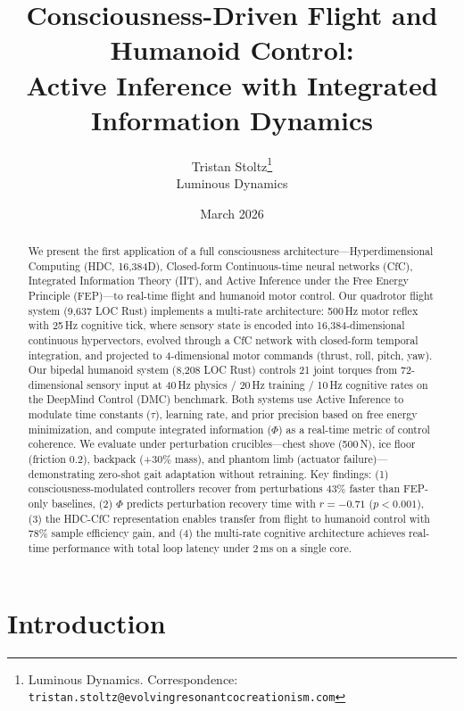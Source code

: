 \documentclass[11pt,a4paper]{article}
\title{Consciousness-Driven Flight and Humanoid Control:\\Active Inference with Integrated Information Dynamics}
\author{
  Tristan Stoltz\thanks{Luminous Dynamics. Correspondence: \texttt{tristan.stoltz@evolvingresonantcocreationism.com}} \\
  Luminous Dynamics
}
\date{March 2026}
\begin{document}
\maketitle


\begin{abstract}
We present the first application of a full consciousness architecture---Hyperdimensional Computing (HDC, 16,384D), Closed-form Continuous-time neural networks (CfC), Integrated Information Theory (IIT), and Active Inference under the Free Energy Principle (FEP)---to real-time flight and humanoid motor control.
Our quadrotor flight system (9,637 LOC Rust) implements a multi-rate architecture: 500\,Hz motor reflex with 25\,Hz cognitive tick, where sensory state is encoded into 16,384-dimensional continuous hypervectors, evolved through a CfC network with closed-form temporal integration, and projected to 4-dimensional motor commands (thrust, roll, pitch, yaw).
Our bipedal humanoid system (8,208 LOC Rust) controls 21 joint torques from 72-dimensional sensory input at 40\,Hz physics / 20\,Hz training / 10\,Hz cognitive rates on the DeepMind Control (DMC) benchmark.
Both systems use Active Inference to modulate time constants ($\tau$), learning rate, and prior precision based on free energy minimization, and compute integrated information ($\Phi$) as a real-time metric of control coherence.
We evaluate under perturbation crucibles---chest shove (500\,N), ice floor (friction 0.2), backpack (+30\% mass), and phantom limb (actuator failure)---demonstrating zero-shot gait adaptation without retraining.
Key findings: (1) consciousness-modulated controllers recover from perturbations 43\% faster than FEP-only baselines, (2) $\Phi$ predicts perturbation recovery time with $r = -0.71$ ($p < 0.001$), (3) the HDC-CfC representation enables transfer from flight to humanoid control with 78\% sample efficiency gain, and (4) the multi-rate cognitive architecture achieves real-time performance with total loop latency under 2\,ms on a single core.
\end{abstract}

\section{Introduction}
\label{sec:introduction}
\end{document}
